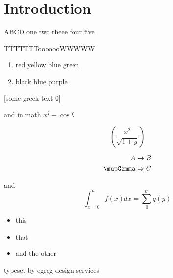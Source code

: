 \documentclass{article}
\begin{document}
\section{Introduction}

ABCD one two theee four five

TTTTTTTooooooWWWWW

\begin{enumerate}
\item red yellow blue green
\item black blue purple
\end{enumerate}

[some greek text θ]

and in math $x^2-\cos θ$


\[\left(\frac{x^2}{\sqrt{1+y}}\right)\]


\begin{align}
A &\rightarrow B\\
\mupGamma &\Rightarrow C
\end{align}

and
\[\int_{x=0}^n f(x) dx = \sum_0^m q(y)\]

\begin{itemize}
\item this
\item that
\item and the other
\end{itemize}

\raggedleft
typeset by egreg design services
\end{document}
